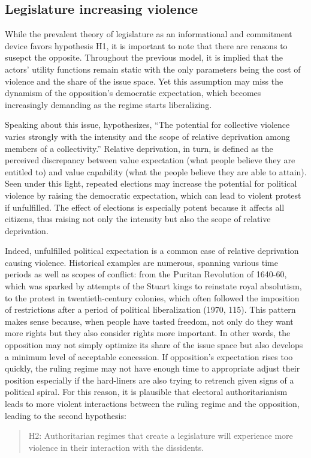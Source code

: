 \subsection{Legislature increasing violence}
While the prevalent theory of legislature as an informational and commitment device favors hypothesis H1, it is important to note that there are reasons to susepct the opposite. Throughout the previous model, it is implied that the actors’ utility functions remain static with the only parameters being the cost of violence and the share of the issue space. Yet this assumption may miss the dynamism of the opposition’s democratic expectation, which becomes increasingly demanding as the regime starts liberalizing.

Speaking about this issue, \citet[24]{Gurr1970} hypothesizes, ``The potential for collective violence varies strongly with the intensity and the scope of relative deprivation among members of a collectivity.'' Relative deprivation, in turn, is defined as the perceived discrepancy between value expectation (what people believe they are entitled to) and value capability (what the people believe they are able to attain). Seen under this light, repeated elections may increase the potential for political violence by raising the democratic expectation, which can lead to violent protest if unfulfilled. The effect of elections is especially potent because it affects all citizens, thus raising not only the intensity but also the scope of relative deprivation.

Indeed, unfulfilled political expectation is a common case of relative deprivation causing violence. Historical examples are numerous, spanning various time periods as well as scopes of conflict: from the Puritan Revolution of 1640-60, which was sparked by attempts of the Stuart kings to reinstate royal absolutism, to the protest in twentieth-century colonies, which often followed the imposition of restrictions after a period of political liberalization (1970, 115). This pattern makes sense because, when people have tasted freedom, not only do they want more rights but they also consider rights more important. In other words, the opposition may not simply optimize its share of the issue space but also develops a minimum level of acceptable concession. If opposition’s expectation rises too quickly, the ruling regime may not have enough time to appropriate adjust their position especially if the hard-liners are also trying to retrench given signs of a political spiral. For this reason, it is plausible that electoral authoritarianism leads to more violent interactions between the ruling regime and the opposition, leading to the second hypothesis:

\begin{quote}
H2: Authoritarian regimes that create a legislature will experience more violence in their interaction with the dissidents.
\end{quote}